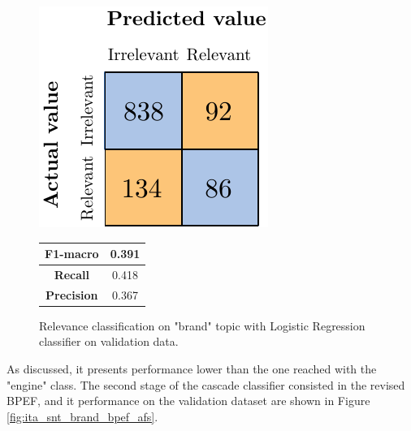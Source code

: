 \begin{figure}[H]
	\begin{minipage}[b]{0.6\linewidth}
		\centering
		\includegraphics[scale=1]{figures/conf_matrices/ita_brand/ita_rel_brand_logreg_afs.pdf}
	\end{minipage}
	\begin{minipage}[b]{0.3\linewidth}
		\begin{tabular}[b]{ | c | c | } 
			\hline
			\textbf{F1-macro} & 0.391 \\
			\hline
			\textbf{Recall} & 0.418 \\ 
			\hline
			\textbf{Precision} & 0.367 \\ 
			\hline
		\end{tabular}
	\end{minipage}
	\caption{Relevance classification on "brand" topic with Logistic Regression classifier on validation data.}
	\label{fig:ita_rel_brand_logreg_afs}
\end{figure}



As discussed, it presents performance lower than the one reached with the "engine" class. The second stage of the cascade classifier consisted in the revised BPEF, and it performance on the validation dataset are shown in Figure \ref{fig:ita_snt_brand_bpef_afs}.


